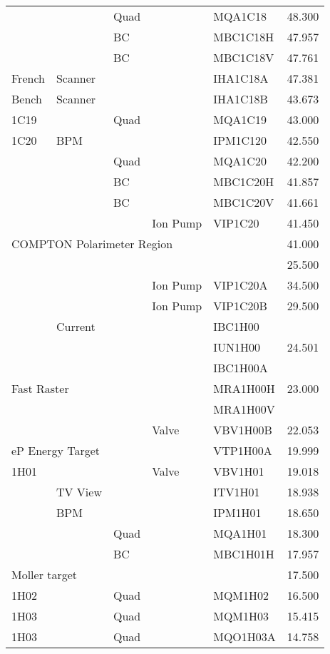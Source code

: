\begin{longtable}[hpt]{lllllr}
&& Quad && MQA1C18 & 48.300 \\
&& BC && MBC1C18H & 47.957 \\
&& BC && MBC1C18V & 47.761 \\ \hline
French & Scanner &&& IHA1C18A & 47.381 \\
Bench & Scanner &&& IHA1C18B & 43.673 \\ \hline
1C19 && Quad && MQA1C19 & 43.000 \\
1C20 & BPM &&& IPM1C120 & 42.550 \\
&& Quad && MQA1C20 & 42.200 \\
&& BC && MBC1C20H & 41.857 \\
&& BC && MBC1C20V & 41.661 \\
&&& Ion Pump & VIP1C20 & 41.450 \\ \hline
\multicolumn{5}{l}{COMPTON Polarimeter Region} & 41.000 \\
& &&&& 25.500 \\
&&& Ion Pump & VIP1C20A & 34.500 \\
&&& Ion Pump & VIP1C20B & 29.500 \\ \hline
& Current &&& IBC1H00 & \\
&&&& IUN1H00 & 24.501 \\
&&&& IBC1H00A & \\
\multicolumn{2}{l}{Fast Raster} &&& MRA1H00H & 23.000 \\ 
&&&& MRA1H00V & \\ 
&&& Valve & VBV1H00B & 22.053 \\
\multicolumn{2}{l}{eP Energy Target} &&& VTP1H00A & 19.999 \\
1H01 &&& Valve & VBV1H01 & 19.018 \\
& TV View &&& ITV1H01 & 18.938 \\
& BPM &&& IPM1H01 & 18.650 \\
&& Quad && MQA1H01 & 18.300 \\
&& BC && MBC1H01H & 17.957 \\
\hline
\multicolumn{2}{l}{Moller target} &&&& 17.500 \\
1H02 && Quad && MQM1H02 & 16.500 \\
1H03 && Quad && MQM1H03 & 15.415 \\
1H03 && Quad && MQO1H03A & 14.758 \\

\end{longtable}
